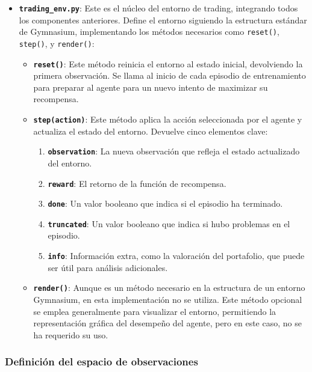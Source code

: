 \documentclass[a4paper,12pt, twoside]{report}
\begin{document}
\begin{itemize}
    \item \textbf{\texttt{trading\_env.py}}: Este es el núcleo del entorno de trading, integrando todos los componentes anteriores. Define el entorno siguiendo la estructura estándar de Gymnasium, implementando los métodos necesarios como \texttt{reset()}, \texttt{step()}, y \texttt{render()}:

    \begin{itemize}
        \item \textbf{\texttt{reset()}}: Este método reinicia el entorno al estado inicial, devolviendo la primera observación. Se llama al inicio de cada episodio de entrenamiento para preparar al agente para un nuevo intento de maximizar su recompensa.
        
        \item \textbf{\texttt{step(action)}}: Este método aplica la acción seleccionada por el agente y actualiza el estado del entorno. Devuelve cinco elementos clave:
        \begin{enumerate}
            \item \textbf{\texttt{observation}}: La nueva observación que refleja el estado actualizado del entorno.
            \item \textbf{\texttt{reward}}: El retorno de la función de recompensa.
            \item \textbf{\texttt{done}}: Un valor booleano que indica si el episodio ha terminado.
            \item \textbf{\texttt{truncated}}: Un valor booleano que indica si hubo problemas en el episodio.
            \item \textbf{\texttt{info}}: Información extra, como la valoración del portafolio, que puede ser útil para análisis adicionales.
        \end{enumerate}

        \item \textbf{\texttt{render()}}: Aunque es un método necesario en la estructura de un entorno Gymnasium, en esta implementación no se utiliza. Este método opcional se emplea generalmente para visualizar el entorno, permitiendo la representación gráfica del desempeño del agente, pero en este caso, no se ha requerido su uso.
    \end{itemize}
\end{itemize}

\subsubsection{Definición del espacio de observaciones}
\label{sec:espacio_observaciones}
\end{document}
